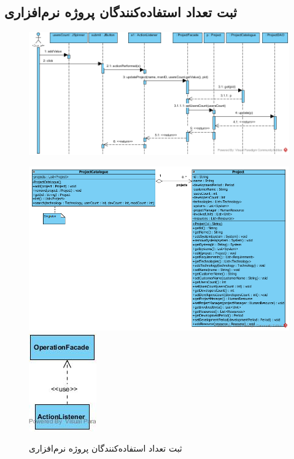 \begin{landscape}
\newpage
\section{ثبت تعداد استفاده‌کنندگان پروژه نرم‌افزاری}
\begin{figure}[H]
	\centering
	\includegraphics[scale=0.8]{img/sequence-design/AddUsersCount}
\end{figure}
\begin{figure}[H]
	\centering
	\includegraphics[scale=0.6]{img/sequence-design/AddUsersCountC}
	\includegraphics[scale=0.6]{img/sequence-design/AddUsersCountUI}
	\caption{ثبت تعداد استفاده‌کنندگان پروژه نرم‌افزاری}
\end{figure}


\end{landscape}
